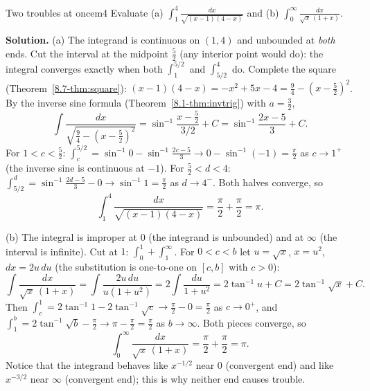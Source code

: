 \documentclass[11pt]{article}
\begin{document}
\begin{exmp}{Two troubles at once}{m4}
Evaluate (a) $\displaystyle\int_1^4\frac{dx}{\sqrt{(x-1)(4-x)}}$ and (b) $\displaystyle\int_0^\infty\frac{dx}{\sqrt x\,(1+x)}$.

\textbf{Solution.} (a) The integrand is continuous on $(1,4)$ and unbounded at \emph{both} ends. Cut the interval at the midpoint $\frac52$ (any interior point would do): the integral converges exactly when both $\int_1^{5/2}$ and $\int_{5/2}^4$ do. Complete the square (Theorem~\ref{8.7-thm:square}): $(x-1)(4-x)=-x^2+5x-4=\frac94-\left(x-\frac52\right)^2$. By the inverse sine formula (Theorem~\ref{8.1-thm:invtrig}) with $a=\frac32$,
\[\int\frac{dx}{\sqrt{\frac94-\left(x-\frac52\right)^2}}=\sin^{-1}\frac{x-\frac52}{3/2}+C=\sin^{-1}\frac{2x-5}3+C .\]
For $1<c<\frac52$: $\int_c^{5/2}=\sin^{-1}0-\sin^{-1}\frac{2c-5}3\to0-\sin^{-1}(-1)=\frac\pi2$ as $c\to1^+$ (the inverse sine is continuous at $-1$). For $\frac52<d<4$: $\int_{5/2}^d=\sin^{-1}\frac{2d-5}3-0\to\sin^{-1}1=\frac\pi2$ as $d\to4^-$. Both halves converge, so
\[\int_1^4\frac{dx}{\sqrt{(x-1)(4-x)}}=\frac\pi2+\frac\pi2=\pi .\]

(b) The integral is improper at $0$ (the integrand is unbounded) and at $\infty$ (the interval is infinite). Cut at $1$: $\int_0^1+\int_1^\infty$. For $0<c<b$ let $u=\sqrt x$, $x=u^2$, $dx=2u\,du$ (the substitution is one-to-one on $[c,b]$ with $c>0$):
\[\int\frac{dx}{\sqrt x\,(1+x)}=\int\frac{2u\,du}{u(1+u^2)}=2\int\frac{du}{1+u^2}=2\tan^{-1}u+C=2\tan^{-1}\sqrt x+C .\]
Then $\int_c^1=2\tan^{-1}1-2\tan^{-1}\sqrt c\to\frac\pi2-0=\frac\pi2$ as $c\to0^+$, and $\int_1^b=2\tan^{-1}\sqrt b-\frac\pi2\to\pi-\frac\pi2=\frac\pi2$ as $b\to\infty$. Both pieces converge, so
\[\int_0^\infty\frac{dx}{\sqrt x\,(1+x)}=\frac\pi2+\frac\pi2=\pi .\]
Notice that the integrand behaves like $x^{-1/2}$ near $0$ (convergent end) and like $x^{-3/2}$ near $\infty$ (convergent end); this is why neither end causes trouble.
\end{exmp}
\end{document}
